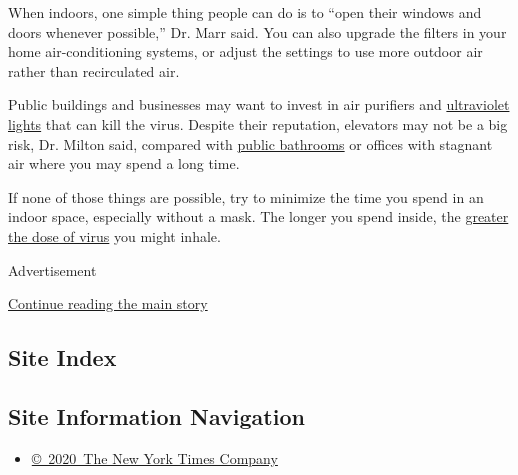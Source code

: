 When indoors, one simple thing people can do is to ``open their windows
and doors whenever possible,'' Dr. Marr said. You can also upgrade the
filters in your home air-conditioning systems, or adjust the settings to
use more outdoor air rather than recirculated air.

Public buildings and businesses may want to invest in air purifiers and
\href{https://www.nytimes3xbfgragh.onion/2020/05/07/science/ultraviolet-light-coronavirus.html}{ultraviolet
lights} that can kill the virus. Despite their reputation, elevators may
not be a big risk, Dr. Milton said, compared with
\href{https://www.nytimes3xbfgragh.onion/2020/06/16/health/coronavirus-toilets-flushing.html}{public
bathrooms} or offices with stagnant air where you may spend a long time.

If none of those things are possible, try to minimize the time you spend
in an indoor space, especially without a mask. The longer you spend
inside, the
\href{https://www.nytimes3xbfgragh.onion/2020/05/29/health/coronavirus-transmission-dose.html}{greater
the dose of virus} you might inhale.

Advertisement

\protect\hyperlink{after-bottom}{Continue reading the main story}

\hypertarget{site-index}{%
\subsection{Site Index}\label{site-index}}

\hypertarget{site-information-navigation}{%
\subsection{Site Information
Navigation}\label{site-information-navigation}}

\begin{itemize}
\tightlist
\item
  \href{https://help.nytimes3xbfgragh.onion/hc/en-us/articles/115014792127-Copyright-notice}{©~2020~The
  New York Times Company}
\end{itemize}

